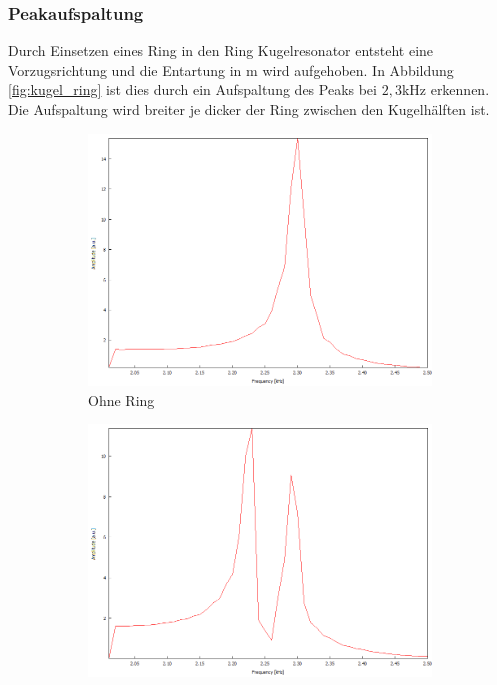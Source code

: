 \subsubsection{Peakaufspaltung}
Durch Einsetzen eines Ring in den Ring Kugelresonator entsteht eine Vorzugsrichtung und die Entartung in m wird aufgehoben.
In Abbildung \ref{fig:kugel_ring} ist dies durch ein Aufspaltung des Peaks bei $2,3$kHz erkennen.
Die Aufspaltung wird breiter je dicker der Ring zwischen den Kugelhälften ist.
\begin{figure}
  \centering
  \begin{subfigure}{0.4\textwidth}
    \centering
    \includegraphics[width=\textwidth]{Bilder/PC_Kugelresonator/180_2000-2500_ohneRing.png}
    \caption{Ohne Ring}
  \end{subfigure}
  \begin{subfigure}{0.4\textwidth}
    \centering
    \includegraphics[width=\textwidth]{Bilder/PC_Kugelresonator/180_2000-2500_3mmRing.png}

\end{subfigure}
\end{figure}
